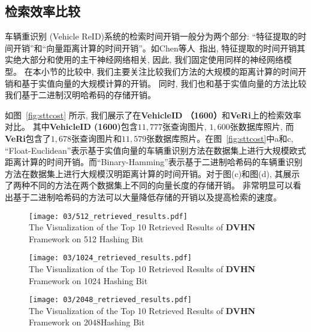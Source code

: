 \subsection{检索效率比较}
车辆重识别 (Vehicle ReID)系统的检索时间开销一般分为两个部分: ``特征提取的时间开销''和``向量距离计算的时间开销''。如Chen等人~\cite{chen2020deep}指出, 特征提取的时间开销其实绝大部分和使用的主干神经网络相关, 因此, 我们固定使用同样的神经网络模型。 在本小节的比较中, 我们主要关注比较我们方法的大规模的距离计算的时间开销和基于实值向量的大规模计算的开销。 同时, 我们也和基于实值向量的方法比较我们基于二进制汉明哈希码的存储开销。\par
如图~\ref{fig:sttcost} 所示, 我们展示了在\textbf{VehicleID （1600）}和\textbf{VeRi}上的检索效率对比。 其中\textbf{VehicleID (1600)}包含$11,777$张查询图片, $1,600$张数据库照片, 而 \textbf{VeRi}包含了$1,678$张查询图片和$11,579$张数据库照片。在图~\ref{fig:sttcost}中a和c, ``Float-Euclidean''表示基于实值向量的车辆重识别方法在数据集上进行大规模欧式距离计算的时间开销。而``Binary-Hamming''表示基于二进制哈希码的车辆重识别方法在数据集上进行大规模汉明距离计算的时间开销。对于图(c)和图(d), 其展示了两种不同的方法在两个数据集上不同的向量长度的存储开销。 非常明显可以看出基于二进制哈希码的方法可以大量降低存储的开销以及提高检索的速度。
\begin{figure}[!htp]
    \centering
    \texttt{[image: 03/512\_retrieved\_results.pdf]} \\
      {The Visualization of the Top 10 Retrieved Results of \textbf{DVHN} Framework on 512 Hashing Bit}
   \label{fig:retrieval512}
\end{figure}
\begin{figure}[!htp]
    \centering
    \texttt{[image: 03/1024\_retrieved\_results.pdf]} \\
      {The Visualization of the Top 10 Retrieved Results of \textbf{DVHN} Framework on 1024 Hashing Bit}
   \label{fig:retrieval1024}
\end{figure}
\begin{figure}[!htp]
    \centering
    \texttt{[image: 03/2048\_retrieved\_results.pdf]} \\
      {The Visualization of the Top 10 Retrieved Results of \textbf{DVHN} Framework on 2048Hashing Bit}
   \label{fig:retrieval2048}
\end{figure}
